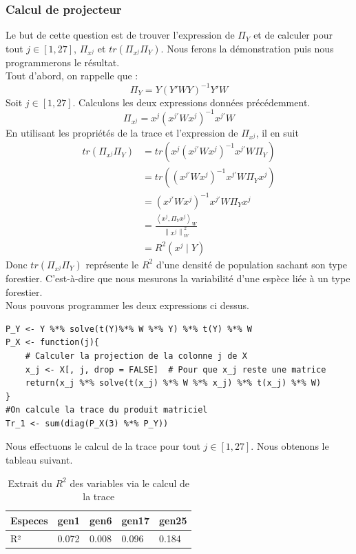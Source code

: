 \documentclass{article}
\begin{document}
\subsubsection{Calcul de projecteur}
Le but de cette question est de trouver l'expression
de $\Pi_Y$ et de calculer pour tout $j \in [1,27]$, $\Pi_{x^{j}}$ et $tr(\Pi_{x^{j}}\Pi_Y)$. Nous ferons la démonstration
puis nous programmerons le résultat. \\
Tout d'abord, on rappelle que :
\[
\Pi_Y = Y(Y'WY)^{-1}Y'W
\]
Soit $j \in [1,27]$. Calculons les deux expressions données précédemment.
\[
\Pi_{x^j}= x^{j}(x^{j\prime}Wx^{j})^{-1}x^{j\prime}W
\]
En utilisant les propriétés de la trace et l'expression de $\Pi_{x^j}$, il en suit 
\begin{align*}
    tr(\Pi_{x^{j}}\Pi_Y) &= tr(x^{j}(x^{j\prime}Wx^{j})^{-1}x^{j\prime}W\Pi_Y) \\
    &=tr((x^{j\prime}Wx^{j})^{-1}x^{j\prime}W\Pi_Yx^{j})\\
    &=(x^{j\prime}Wx^{j})^{-1}x^{j\prime}W\Pi_Yx^{j}\\
    &= \frac{\left\langle x^{j},\Pi_Yx^{j}\right\rangle_W }{\left\lVert x^j\right\rVert^2_W }\\
    &= R^2(x^j\mid Y )
\end{align*}
Donc $tr(\Pi_{x^{j}}\Pi_Y)$ représente le $R^2$ d'une densité de population sachant son type forestier. C'est-à-dire que nous 
mesurons la variabilité d'une espèce liée à un type forestier. \\
Nous pouvons programmer les deux expressions ci dessus. \\
\begin{lstlisting}[caption=Extrait du code R, label= Question 1b]
P_Y <- Y %*% solve(t(Y)%*% W %*% Y) %*% t(Y) %*% W
P_X <- function(j){
    # Calculer la projection de la colonne j de X
    x_j <- X[, j, drop = FALSE]  # Pour que x_j reste une matrice
    return(x_j %*% solve(t(x_j) %*% W %*% x_j) %*% t(x_j) %*% W)
}
#On calcule la trace du produit matriciel
Tr_1 <- sum(diag(P_X(3) %*% P_Y))
\end{lstlisting}
Nous effectuons le calcul de la trace pour tout $j \in [1,27]$. Nous obtenons le tableau suivant. 
\begin{table}[H]
    \centering
    \caption{Extrait du $R^2$ des variables via le calcul de la trace}
    \label{tab:statistiques 1.b}
    \begin{tabular}{|l|l|l|l|l|}
    \hline
    Especes & gen1  & gen6  & gen17 & gen25 \\ \hline
    R²      & 0.072 & 0.008 & 0.096 & 0.184 \\ \hline
    \end{tabular}
    \centering
\end{table}
\end{document}
